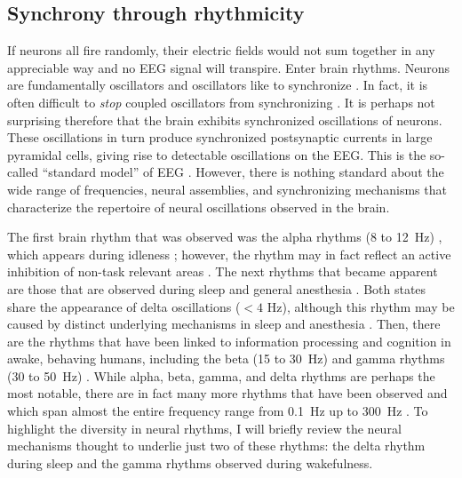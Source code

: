 \subsection{Synchrony through rhythmicity}
If neurons all fire randomly, their electric fields would not sum together in any appreciable way and no EEG signal will transpire. Enter brain rhythms. Neurons are fundamentally oscillators \cite{HODGKIN1952} and oscillators like to synchronize \cite{Strogatz2015}. In fact, it is often difficult to \textit{stop} coupled oscillators from synchronizing \cite{Erb1992}. It is perhaps not surprising therefore that the brain exhibits synchronized oscillations of neurons. These oscillations in turn produce synchronized postsynaptic currents in large pyramidal cells, giving rise to detectable oscillations on the EEG. This is the so-called ``standard model'' of EEG \cite{Cohen2017}. However, there is nothing standard about the wide range of frequencies, neural assemblies, and synchronizing mechanisms that characterize the repertoire of neural oscillations observed in the brain.

The first brain rhythm that was observed was the alpha rhythms (8 to \qty{12}{\hertz}) \cite{Berger1929}, which appears during idleness \cite{Adrian1934}; however, the rhythm may in fact reflect an active inhibition of non-task relevant areas \cite{Cooper2003}. The next rhythms that became apparent are those that are observed during sleep \cite{Loomis1937,Weber2016} and general anesthesia \cite{GIBBS1937,Akeju2017}. Both states share the appearance of delta oscillations ($<4$ \unit{\hertz}), although this rhythm may be caused by distinct underlying mechanisms in sleep and anesthesia \cite{Akeju2017}. Then, there are the rhythms that have been linked to information processing and cognition in awake, behaving humans, including the beta (15 to \qty{30}{\hertz}) \cite{Spitzer2017} and gamma rhythms (30 to \qty{50}{\hertz}) \cite{JASPER1938,Fries2009}. While alpha, beta, gamma, and delta rhythms are perhaps the most notable, there are in fact many more rhythms that have been observed and which span almost the entire frequency range from \qty{0.1}{\hertz} up to \qty{300}{\hertz} \cite{Penttonen2003}. To highlight the diversity in neural rhythms, I will briefly review the neural mechanisms thought to underlie just two of these rhythms: the delta rhythm during sleep and the gamma rhythms observed during wakefulness.

